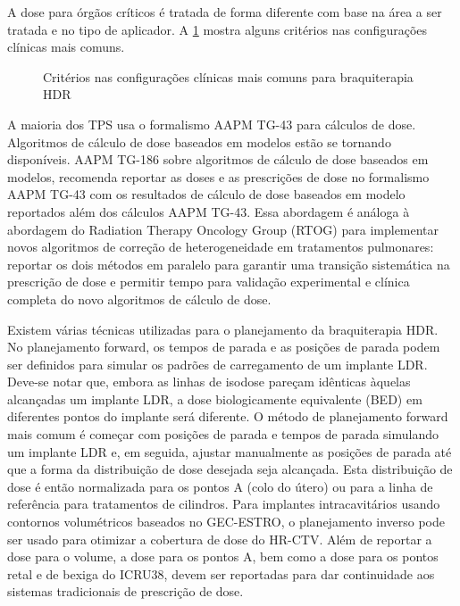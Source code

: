 \documentclass[11pt,a4paper]{article}
\begin{document}
	A dose para órgãos críticos é tratada de forma diferente com base na área a ser tratada e no tipo de aplicador. A \ref{fig:criteriosBraqui} mostra alguns critérios nas configurações clínicas mais comuns.

	\begin{figure}[h]
		\centering
		\caption{Critérios nas configurações clínicas mais comuns para braquiterapia HDR}
		\label{fig:criteriosBraqui}
	\end{figure}

	A maioria dos TPS usa o formalismo AAPM TG-43 para cálculos de dose. Algoritmos de cálculo de dose baseados em modelos estão se tornando disponíveis. AAPM TG-186 sobre algoritmos de cálculo de dose baseados em modelos, recomenda reportar as doses e as prescrições de dose no formalismo AAPM TG-43 com os resultados de cálculo de dose baseados em modelo reportados além dos cálculos AAPM TG-43. Essa abordagem é análoga à abordagem do Radiation Therapy Oncology Group (RTOG) para implementar novos algoritmos de correção de heterogeneidade em tratamentos pulmonares: reportar os dois métodos em paralelo para garantir uma transição sistemática na prescrição de dose e permitir tempo para validação experimental e clínica completa do novo algoritmos de cálculo de dose.

	Existem várias técnicas utilizadas para o planejamento da braquiterapia HDR. No planejamento forward, os tempos de parada e as posições de parada podem ser definidos para simular os padrões de carregamento de um implante LDR. Deve-se notar que, embora as linhas de isodose pareçam idênticas àquelas alcançadas um implante LDR, a dose biologicamente equivalente (BED) em diferentes pontos do implante será diferente. O método de planejamento forward mais comum é começar com posições de parada e tempos de parada simulando um implante LDR e, em seguida, ajustar manualmente as posições de parada até que a forma da distribuição de dose desejada seja alcançada. Esta distribuição de dose é então normalizada para os pontos A (colo do útero) ou para a linha de referência para tratamentos de cilindros. Para implantes intracavitários usando contornos volumétricos baseados no GEC-ESTRO, o planejamento inverso pode ser usado para otimizar a cobertura de dose do HR-CTV. Além de reportar a dose para o volume, a dose para os pontos A, bem como a dose para os pontos retal e de bexiga do ICRU38, devem ser reportadas para dar continuidade aos sistemas tradicionais de prescrição de dose.


\end{document}
